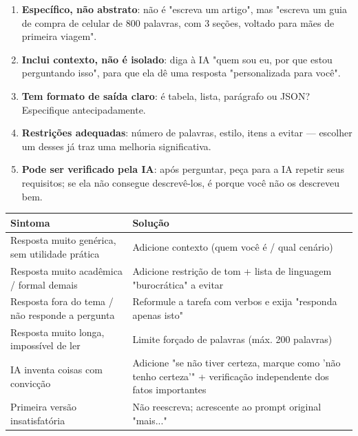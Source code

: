 \begin{enumerate}
  \item \textbf{Específico, não abstrato}: não é "escreva um artigo", mas "escreva um guia de compra de celular de 800 palavras, com 3 seções, voltado para mães de primeira viagem".
  \item \textbf{Inclui contexto, não é isolado}: diga à IA "quem sou eu, por que estou perguntando isso", para que ela dê uma resposta "personalizada para você".
  \item \textbf{Tem formato de saída claro}: é tabela, lista, parágrafo ou JSON? Especifique antecipadamente.
  \item \textbf{Restrições adequadas}: número de palavras, estilo, itens a evitar — escolher um desses já traz uma melhoria significativa.
  \item \textbf{Pode ser verificado pela IA}: após perguntar, peça para a IA repetir seus requisitos; se ela não consegue descrevê-los, é porque você não os descreveu bem.
\end{enumerate}


\begin{center}
\begin{tabularx}{\linewidth}{|X|X|}
\hline
\textbf{Sintoma} & \textbf{Solução} \tabularnewline
\hline
Resposta muito genérica, sem utilidade prática & Adicione contexto (quem você é / qual cenário) \tabularnewline
Resposta muito acadêmica / formal demais & Adicione restrição de tom + lista de linguagem "burocrática" a evitar \tabularnewline
Resposta fora do tema / não responde a pergunta & Reformule a tarefa com verbos e exija "responda apenas isto" \tabularnewline
Resposta muito longa, impossível de ler & Limite forçado de palavras (máx. 200 palavras) \tabularnewline
IA inventa coisas com convicção & Adicione "se não tiver certeza, marque como 'não tenho certeza'" + verificação independente dos fatos importantes \tabularnewline
Primeira versão insatisfatória & Não reescreva; acrescente ao prompt original "mais..." \tabularnewline
\hline
\end{tabularx}
\end{center}


